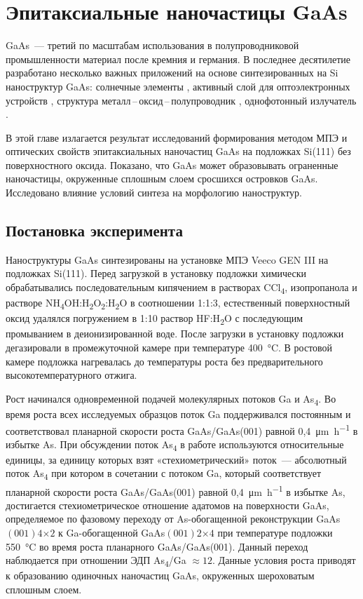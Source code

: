 \chapter{Эпитаксиальные наночастицы GaAs}\label{ch:ch5}

GaAs~--- третий по масштабам использования в полупроводниковой промышленности
материал после кремния и германия. В последнее десятилетие разработано
несколько важных приложений на основе синтезированных на Si наноструктур GaAs:
солнечные элементы \cite{Chu2014}, активный слой для оптоэлектронных устройств
\cite{Bietti2009}, структура металл\,--\,оксид\,--\,полупроводник
\cite{Zhao2009}, однофотонный излучатель \cite{Sanguinetti2015}.

В этой главе излагается результат исследований формирования методом МПЭ и
оптических свойств эпитаксиальных наночастиц GaAs на подложках Si(111) без
поверхностного оксида. Показано, что GaAs может образовывать ограненные
наночастицы, окруженные сплошным слоем сросшихся островков GaAs. Исследовано
влияние условий синтеза на морфологию наноструктур.

\section{Постановка эксперимента}\label{sec:ch5/sec1}

Наноструктуры GaAs синтезированы на установке МПЭ Veeco GEN III на подложках
Si(111). Перед загрузкой в установку подложки химически обрабатывались
последовательным кипячением в растворах CCl\textsubscript{4}, изопропанола и
растворе
NH\textsubscript{4}OH:H\textsubscript{2}O\textsubscript{2}:H\textsubscript{2}O
в соотношении 1:1:3, естественный поверхностный оксид удалялся погружением в
1:10 раствор HF:H\textsubscript{2}O с последующим промыванием в
деионизированной воде. После загрузки в установку подложки дегазировали в
промежуточной камере при температуре 400~\si{\degreeCelsius}. В ростовой камере
подложка нагревалась до температуры роста без предварительного
высокотемпературного отжига.

Рост начинался одновременной подачей молекулярных потоков Ga и
As\textsubscript{4}. Во время роста всех исследуемых образцов поток Ga
поддерживался постоянным и соответствовал планарной скорости роста
GaAs/GaAs(001) равной 0,4~\si{\micro\metre\per\hour} в избытке As. При
обсуждении поток As\textsubscript{4} в работе используются относительные
единицы, за единицу которых взят «стехиометрический» поток~--- абсолютный поток
As\textsubscript{4} при котором в сочетании с потоком Ga, который соответствует
планарной скорости роста GaAs/GaAs(001) равной 0,4~\si{\micro\metre\per\hour} в
избытке As, достигается стехиометрическое отношение адатомов на поверхности
GaAs, определяемое по фазовому переходу от As-обогащенной реконструкции
GaAs\((001)4\)\(\times\)\(2\) к Ga-обогащенной GaAs\((001)2\)\(\times\)\(4\)
при температуре подложки 550~\si{\degreeCelsius} во время роста планарного
GaAs/GaAs(001). Данный переход наблюдается при отношении ЭДП
As\textsubscript{4}/Ga \(\approx 12\). Данные условия роста приводят к
образованию одиночных наночастиц GaAs, окруженных шероховатым сплошным слоем.

